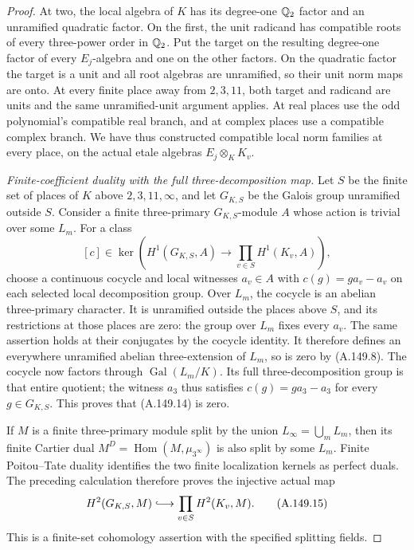 \begin{proof}
At two, the local algebra of \(K\) has its
degree-one \(\mathbb Q_2\) factor and an unramified
quadratic factor.  On the first, the unit
radicand has compatible roots of every
three-power order in \(\mathbb Q_2\).
Put the target on the resulting degree-one
factor of every \(E_j\)-algebra and one on
the other factors.
On the quadratic factor the target is a unit
and all root algebras are unramified, so
their unit norm maps are onto.
At every finite place away from \(2,3,11\),
both target and radicand are units and the
same unramified-unit argument applies.
At real places use the odd polynomial's
compatible real branch, and at complex
places use a compatible complex branch.
We have thus constructed compatible local
norm families at every place, on the
actual etale algebras \(E_j\otimes_KK_v\).

\emph{Finite-coefficient duality with the full three-decomposition map.}
Let \(S\) be the finite set of places of \(K\)
above \(2,3,11,\infty\), and let \(G_{K,S}\)
be the Galois group unramified outside \(S\).
Consider a finite three-primary \(G_{K,S}\)-module
\(A\) whose action is trivial over some \(L_m\).
For a class
\[
 [c]\in\ker\!\left(H^1(G_{K,S},A)
               \longrightarrow\prod_{v\in S}H^1(K_v,A)\right),
\tag{A.149.14}
\]
choose a continuous cocycle and local witnesses
\(a_v\in A\) with \(c(g)=g a_v-a_v\) on
each selected local decomposition group.
Over \(L_m\), the cocycle is an abelian
three-primary character.
It is unramified outside the places above \(S\),
and its restrictions at those places are zero:
the group over \(L_m\) fixes every \(a_v\).
The same assertion holds at their conjugates
by the cocycle identity.
It therefore defines an everywhere unramified
abelian three-extension of \(L_m\), so is zero
by (A.149.8).
The cocycle now factors through
\(\operatorname{Gal}(L_m/K)\).
Its full three-decomposition group is that
entire quotient; the witness \(a_3\) thus
satisfies \(c(g)=g a_3-a_3\) for every
\(g\in G_{K,S}\).
This proves that (A.149.14) is zero.

If \(M\) is a finite three-primary module
split by the union \(L_\infty=\bigcup_mL_m\),
then its finite Cartier dual
\(M^D=\operatorname{Hom}(M,\mu_{3^\infty})\)
is also split by some \(L_m\).
Finite Poitou--Tate duality
\cite[I, Theorem 4.10(a)]{BIR_MilneADT}
identifies the two finite localization kernels
as perfect duals.  The preceding calculation
therefore proves the injective actual map
\[
 H^2(G_{K,S},M)\lhook\joinrel\longrightarrow
                         \prod_{v\in S}H^2(K_v,M).
\tag{A.149.15}
\]
This is a finite-set cohomology assertion
with the specified splitting fields.


\end{proof}
